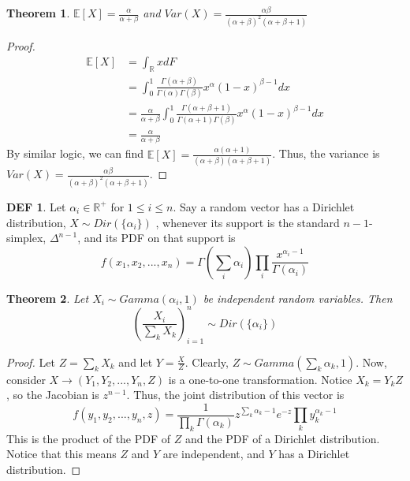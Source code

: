 \documentclass{article}
\newtheorem{theorem}{Theorem}
\theoremstyle{definition}\newtheorem{definition}{DEF}
\theoremstyle{definition}\newtheorem{example}{Ex}
\theoremstyle{lemma}\newtheorem{lemma}{Lemma}
\theoremstyle{corrolary}\newtheorem{corrolary}{Cor}
\begin{document}
\begin{theorem}
$\mathbb{E}[X]=\frac{\alpha}{\alpha + \beta}$ and $Var(X)=\frac{\alpha \beta}{(\alpha +\beta)^2 (\alpha +\beta +1)}$
\end{theorem}
\begin{proof}
\begin{align*}
\mathbb{E}[X]&=\int_\mathbb{R} xdF\\
&=\int_0^1 \frac{\Gamma(\alpha + \beta)}{\Gamma(\alpha)\Gamma(\beta)} x^\alpha (1-x)^{\beta -1}dx\\
&=\frac{\alpha}{\alpha+\beta} \int_0^1 \frac{\Gamma(\alpha + \beta+1)}{\Gamma(\alpha+1)\Gamma(\beta)} x^\alpha (1-x)^{\beta -1}dx\\
&=\frac{\alpha}{\alpha + \beta}
\end{align*}
By similar logic, we can find $\mathbb{E}[X]=\frac{\alpha (\alpha+1)}{(\alpha+\beta)(\alpha+\beta+1)}$.
Thus, the variance is $Var(X)=\frac{\alpha \beta}{(\alpha +\beta)^2 (\alpha +\beta +1)}$.
\end{proof}

\begin{definition}
Let $\alpha_i\in\mathbb{R}^{+}$ for $1\leq i \leq n$.
Say a random vector has a Dirichlet distribution, $X\sim Dir(\{\alpha_i \})$ , whenever its support is the standard $n-1$-simplex, $\Delta^{n-1}$, and its PDF on that support is
\begin{equation}
f(x_1, x_2, ..., x_n)=\Gamma(\sum_i \alpha_i) \prod_i \frac{x^{\alpha_i-1}}{\Gamma(\alpha_i)}
\end{equation}
\end{definition}

\begin{theorem}
Let $X_i \sim Gamma(\alpha_i ,1)$ be independent random variables.
Then
\begin{equation}
\left(\frac{X_i}{\sum_k X_k}\right)_{i=1}^n \sim Dir(\{\alpha_i \})
\end{equation}
\end{theorem}
\begin{proof}
Let $Z=\sum_k X_k$ and let $Y=\frac{X}{Z}$.
Clearly, $Z\sim Gamma(\sum_k \alpha_k,1)$.
Now, consider $X \rightarrow (Y_1, Y_2, ..., Y_n, Z)$ is a one-to-one transformation.
Notice $X_k=Y_kZ$, so the Jacobian is $z^{n-1}$.
Thus, the joint distribution of this vector is 
\begin{equation*}
f(y_1, y_2, ..., y_n, z)=\frac{1}{\prod_k \Gamma(\alpha_k)} z^{\sum_k \alpha_k -1} e^{-z} \prod_k y_k^{\alpha_k -1}
\end{equation*}
This is the product of the PDF of $Z$ and the PDF of a Dirichlet distribution.
Notice that this means $Z$ and $Y$ are independent, and $Y$ has a Dirichlet distribution.
\end{proof}
\end{document}
